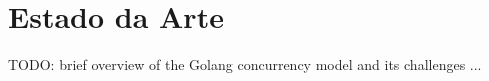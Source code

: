 \chapter{Estado da Arte}
\label{cha:state_of_art}

TODO: brief overview of the Golang concurrency model and its challenges ...

